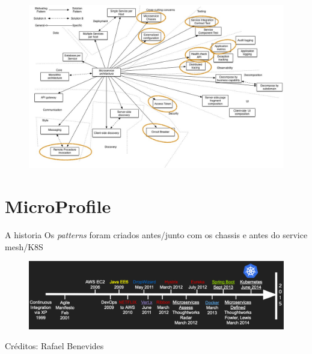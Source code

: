 \documentclass[aspectratio=169]{beamer}
\begin{document}
\begin{frame}{}
\begin{figure}
	\centering
	\includegraphics[width=\linewidth]{Images/PatternsRelatedToMicroservices2}
\end{figure}
\end{frame}



{
    \section{MicroProfile}
}

\begin{frame}{A historia}
Os \textit{patterns} foram criados antes/junto com os chassis e antes do service mesh/K8S
\begin{figure}
	\centering
	\includegraphics[width=\linewidth]{Images/timeline}
\end{figure}
Créditos: Rafael Benevides

\end{frame}
\end{document}
